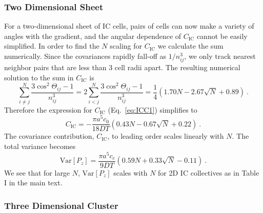 \subsubsection{Two Dimensional Sheet}

For a two-dimensional sheet of IC cells, pairs of cells can now make a variety of angles with the gradient, and the angular dependence of $C_\text{IC}$ cannot be easily simplified. In order to find the $N$ scaling for $C_\text{IC}$ we calculate the sum numerically. Since the covariances rapidly fall-off as $1/n^3_{ij}$, we only track nearest neighbor pairs that are less than 3 cell radii apart. The resulting numerical solution to the sum in $C_\text{IC}$ is
\begin{equation*}
    \sum_{i\neq j}^N \frac{3\cos^2\Theta_{ij}-1}{n_{ij}^3}
    = 2 \sum_{i<j}^N \frac{3\cos^2\Theta_{ij}-1}{n_{ij}^3}
    = \frac{1}{4} (1.70 N - 2.67 \sqrt{N} + 0.89) \ .
\end{equation*}
Therefore the expression for $C_\text{IC}$ (Eq.\ \ref{eq:ICC1}) simplifies to
\begin{equation}
    C_\text{IC} = -\frac{\pi a^5c_0}{18DT} (0.43 N - 0.67 \sqrt{N} + 0.22) \ .
\end{equation}
The covariance contribution, $C_\text{IC}$, to leading order scales linearly with $N$.
The total variance becomes
\begin{equation}
    \text{Var}[P_z] = \frac{\pi a^5c_c}{9DT} \left( 0.59 N + 0.33 \sqrt{N} - 0.11 \right) \ .
\end{equation}
We see that for large $N$, $\text{Var}[P_z]$ scales with $N$ for 2D IC collectives as in Table I in the main text.


\subsubsection{Three Dimensional Cluster}

